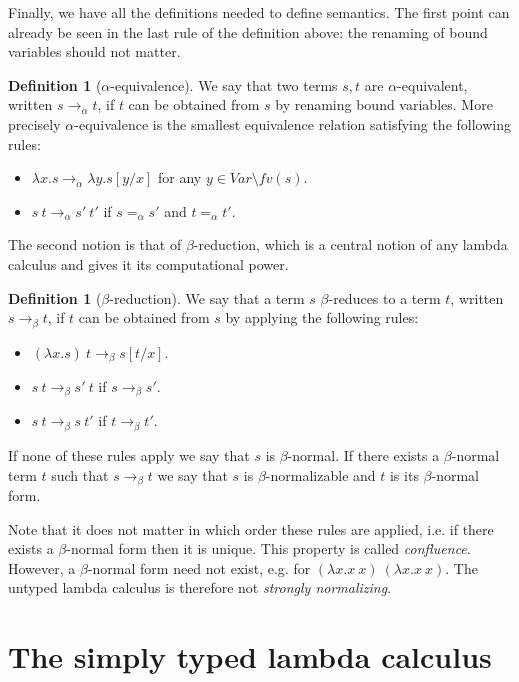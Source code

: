 \documentclass[11pt]{article}
\theoremstyle{definition}
\theoremstyle{definition}
\theoremstyle{definition}
\theoremstyle{definition}
\theoremstyle{definition}
\newtheorem{definition}[theorem]{Definition}
\theoremstyle{definition}
\theoremstyle{definition}
\newcommand{\fv}{\mathit{fv}}
\newcommand{\var}{\mathit{Var}}
\begin{document}
	Finally, we have all the definitions needed to define semantics. The first point can already be seen in the last rule of the definition above: the renaming of bound variables should not matter.

	\begin{definition}[$\alpha$-equivalence]
		We say that two terms $s, t$ are $\alpha$-equivalent, written $s\to_\alpha t$, if $t$ can be obtained from $s$ by renaming bound variables. More precisely $\alpha$-equivalence is the smallest equivalence relation satisfying the following rules:
		\begin{itemize}
			\item $\lambda x. s \to_\alpha \lambda y. s[y/x]$ for any $y\in \var\setminus\fv(s)$.
			\item $s\ t \to_\alpha s'\ t'$ if $s=_\alpha s'$ and $t=_\alpha t'$.
		\end{itemize}
	\end{definition}

	The second notion is that of $\beta$-reduction, which is a central notion of any lambda calculus and gives it its computational power.

	\begin{definition}[$\beta$-reduction]
		We say that a term $s$ $\beta$-reduces to a term $t$, written $s\to_\beta t$, if $t$ can be obtained from $s$ by applying the following rules:
		\begin{itemize}
			\item $(\lambda x. s)\ t \to_\beta s[t/x]$.
			\item $s\ t \to_\beta s'\ t$ if $s\to_\beta s'$.
			\item $s\ t \to_\beta s\ t'$ if $t\to_\beta t'$.
		\end{itemize}
		If none of these rules apply we say that $s$ is $\beta$-normal. If there exists a $\beta$-normal term $t$ such that $s\to_\beta t$ we say that $s$ is $\beta$-normalizable and $t$ is its $\beta$-normal form.
	\end{definition}

	Note that it does not matter in which order these rules are applied, i.e. if there exists a $\beta$-normal form then it is unique. This property is called \emph{confluence}. However, a $\beta$-normal form need not exist, e.g. for $(\lambda x. x\ x)\ (\lambda x. x\ x)$. The untyped lambda calculus is therefore not \emph{strongly normalizing}.

	\section{The simply typed lambda calculus}
\end{document}
